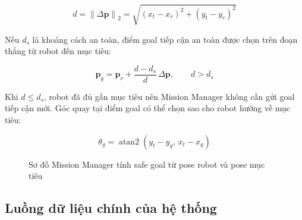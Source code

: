 \begin{equation}
    d = \left\lVert \Delta \mathbf{p} \right\rVert_2
    = \sqrt{(x_t-x_r)^2 + (y_t-y_r)^2}
    \label{eq:robot-target-distance}
\end{equation}

Nếu $d_s$ là khoảng cách an toàn, điểm goal tiếp cận an toàn được chọn trên đoạn thẳng từ robot đến mục tiêu:

\begin{equation}
    \mathbf{p}_g
    = \mathbf{p}_r + \frac{d-d_s}{d}\,\Delta \mathbf{p},
    \qquad d > d_s
    \label{eq:safe-goal}
\end{equation}

Khi $d \leq d_s$, robot đã đủ gần mục tiêu nên Mission Manager không cần gửi goal tiếp cận mới. Góc quay tại điểm goal có thể chọn sao cho robot hướng về mục tiêu:

\begin{equation}
    \theta_g = \operatorname{atan2}(y_t-y_g,\, x_t-x_g)
    \label{eq:safe-goal-yaw}
\end{equation}

\begin{figure}[H]
\centering
{}
\caption{Sơ đồ Mission Manager tính safe goal từ pose robot và pose mục tiêu}
\label{fig:mission-manager-safe-goal}
\end{figure}

\subsection{Luồng dữ liệu chính của hệ thống}
\label{subsec:main-data-flow}

